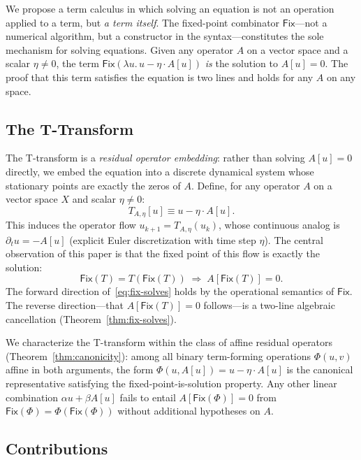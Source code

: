 \documentclass{lmcs}
\theoremstyle{plain}
\theoremstyle{definition}
\newcommand{\Lam}[1]{\lambda #1.\,}
\newcommand{\fix}{\mathsf{Fix}}
\begin{document}
We propose a term calculus in which solving an equation is not an operation
applied to a term, but \emph{a term itself}. The fixed-point combinator
$\fix$---not a numerical algorithm, but a constructor in the
syntax---constitutes the sole mechanism for solving equations. Given any
operator $A$ on a vector space and a scalar $\eta \neq 0$, the term
$\fix(\Lam{u} u - \eta \cdot A[u])$ \emph{is} the solution to $A[u] = 0$.
The proof that this term satisfies the equation is two lines and holds for
any $A$ on any space.

\subsection{The T-Transform}

The T-transform is a \emph{residual operator embedding}: rather than solving
$A[u] = 0$ directly, we embed the equation into a discrete dynamical system
whose stationary points are exactly the zeros of $A$. Define, for any operator
$A$ on a vector space $X$ and scalar $\eta \neq 0$:
\begin{equation}\label{eq:T}
  T_{A,\eta}[u] \equiv u - \eta \cdot A[u].
\end{equation}
This induces the operator flow $u_{k+1} = T_{A,\eta}(u_k)$, whose continuous
analog is $\partial_t u = -A[u]$ (explicit Euler discretization with time step
$\eta$). The central observation of this paper is that the fixed point of this
flow is exactly the solution:
\begin{equation}\label{eq:fix-solves}
  \fix(T) = T(\fix(T)) \;\Longrightarrow\; A[\fix(T)] = 0.
\end{equation}
The forward direction of~\eqref{eq:fix-solves} holds by the operational
semantics of $\fix$. The reverse direction---that $A[\fix(T)] = 0$
follows---is a two-line algebraic cancellation (Theorem~\ref{thm:fix-solves}).

We characterize the T-transform within the class of affine residual operators
(Theorem~\ref{thm:canonicity}): among all binary term-forming operations
$\Phi(u, v)$ affine in both arguments, the form
$\Phi(u, A[u]) = u - \eta \cdot A[u]$ is the canonical representative
satisfying the fixed-point-is-solution property. Any other linear combination
$\alpha u + \beta A[u]$ fails to entail $A[\fix(\Phi)] = 0$ from
$\fix(\Phi) = \Phi(\fix(\Phi))$ without additional hypotheses on $A$.

\subsection{Contributions}
\end{document}
